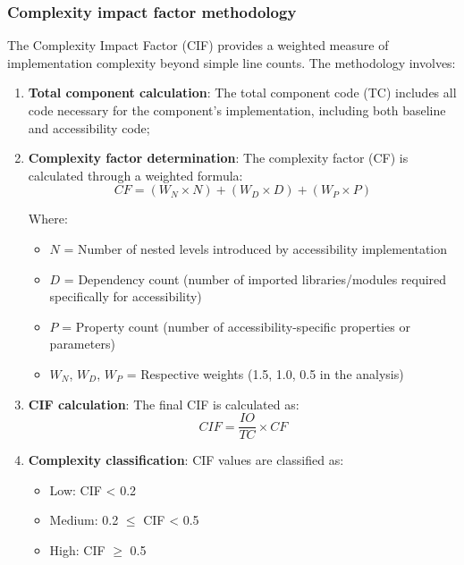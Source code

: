 \subsubsection{Complexity impact factor methodology}
\label{subsubsec:cif-methodology}

The Complexity Impact Factor (CIF) provides a weighted measure of implementation complexity beyond simple line counts. The methodology involves:

\begin{enumerate}
    \item \textbf{Total component calculation}: The total component code (TC) includes all code necessary for the component's implementation, including both baseline and accessibility code;
    
    \item \textbf{Complexity factor determination}: The complexity factor (CF) is calculated through a weighted formula:
    \begin{equation}
    CF = (W_N \times N) + (W_D \times D) + (W_P \times P)
    \end{equation}
    
    Where:
    \begin{itemize}
        \item $N$ = Number of nested levels introduced by accessibility implementation
        \item $D$ = Dependency count (number of imported libraries/modules required specifically for accessibility)
        \item $P$ = Property count (number of accessibility-specific properties or parameters)
        \item $W_N$, $W_D$, $W_P$ = Respective weights (1.5, 1.0, 0.5 in the analysis)
    \end{itemize}
    
    \item \textbf{CIF calculation}: The final CIF is calculated as:
    \begin{equation}
    CIF = \frac{IO}{TC} \times CF
    \end{equation}
    
    \item \textbf{Complexity classification}: CIF values are classified as:
    \begin{itemize}
        \item Low: CIF < 0.2
        \item Medium: 0.2 $\leq$ CIF < 0.5
        \item High: CIF $\geq$ 0.5
    \end{itemize}
\end{enumerate}

